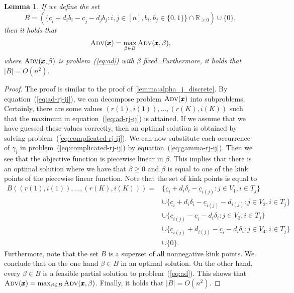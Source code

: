 \documentclass[a4paper,11pt,abstracton]{scrartcl}
\newtheorem{lem}{Lemma}%
\theoremstyle{definition}
\theoremstyle{remark}
\newcommand{\rr}{\mathbb{R}}
\begin{document}
\begin{lem}
\label{lemma:beta_discrete}
  If we define the set
  \[ B = \left( \{ \underline{c}_i + d_i b_i - \underline{c}_j - d_j b_j : i,j\in[n], b_i,b_j\in\{0,1\} \} \cap \rr_{\geq 0}\right) \cup \{0\}, \]
  then it holds that
  \[ \textsc{Adv}(\pmb{x}) = \max_{\beta \in B} \textsc{Adv}(\pmb{x},\beta), \]
  where $\textsc{Adv}(\pmb{x},\beta)$ is problem~(\ref{eq:ad}) with $\beta$ fixed. Furthermore, it holds that $|B| = O(n^2)$.
\end{lem}
\begin{proof}
The proof is similar to the proof of \cref{lemma:alpha_j_discrete}. By equation~(\ref{eq:ad-rj-ij}), we can decompose problem $\textsc{Adv}(\pmb x)$ into subproblems. Certainly, there are some values $(r(1), i(1)), \dots, (r(K), i(K))$ such that the maximum in equation~(\ref{eq:ad-rj-ij}) is attained. If we assume that we have guessed these values correctly, then an optimal solution is obtained by solving problem~(\ref{eq:complicated-rj-ij}). We can now substitute each occurrence of $\gamma_i$ in problem~(\ref{eq:complicated-rj-ij}) by equation~(\ref{eq:gamma-rj-ij}). Then we see that the objective function is piecewise linear in $\beta$. 
This implies that there is an optimal solution where we have that $\beta \geq 0$ and $\beta$ is equal to one of the kink points of the piecewise linear function. Note that the set of kink points is equal to 
\begin{align*}
B((r(1),i(1)),\ldots,(r(K),i(K)))  = &\{ \underline{c}_i + d_i\delta_i - \underline{c}_{i(j)} : j \in V_1, i\in T_j\} \\
& \cup  \{ \underline{c}_i + d_i\delta_i - \underline{c}_{i(j)} - d_{i(j)} : j \in V_2, i\in T_j\} \\
& \cup  \{ \underline{c}_{i(j)} - \underline{c}_i - d_i\delta_i  : j \in V_3, i\in T_j\} \\
& \cup  \{  \underline{c}_{i(j)} + d_{i(j)} - \underline{c}_i - d_i\delta_i : j \in V_4, i\in T_j\} \\
& \cup \{0\}.
\end{align*}
Furthermore, note that the set $B$ is a superset of all nonnegative kink points. We conclude that on the one hand $\beta \in B$ in an optimal solution. On the other hand, every $\beta \in B$ is a feasible partial solution to problem~(\ref{eq:ad}). This shows that $\textsc{Adv}(\pmb{x}) = \max_{\beta \in B} \textsc{Adv}(\pmb{x},\beta)$. Finally, it holds that $|B| = O(n^2)$. 
\end{proof}
\end{document}
